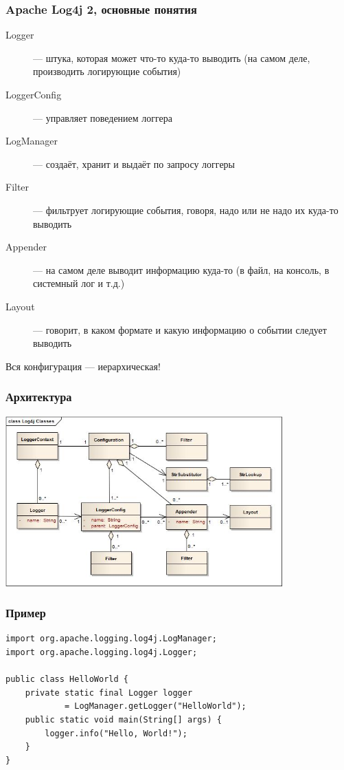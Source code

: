 \documentclass[xetex,mathserif,serif]{beamer}
\begin{document}
	\begin{frame}
		\frametitle{Apache Log4j 2, основные понятия}
		\begin{description}
			\item [Logger] --- штука, которая может что-то куда-то выводить (на самом деле, производить логирующие события)
			\item [LoggerConfig] --- управляет поведением логгера
			\item [LogManager] --- создаёт, хранит и выдаёт по запросу логгеры
			\item [Filter] --- фильтрует логирующие события, говоря, надо или не надо их куда-то выводить
			\item [Appender] --- на самом деле выводит информацию куда-то (в файл, на консоль, в системный лог и т.д.)
			\item [Layout] --- говорит, в каком формате и какую информацию о событии следует выводить
		\end{description}
		\begin{center}Вся конфигурация --- иерархическая!\end{center}
	\end{frame}

	\begin{frame}
		\frametitle{Архитектура}
		\begin{center}
			\includegraphics[width=0.8\textwidth]{log4jClasses.jpg}
		\end{center}
	\end{frame}

	\begin{frame}[fragile]
		\frametitle{Пример}
		\begin{verbatim}
import org.apache.logging.log4j.LogManager;
import org.apache.logging.log4j.Logger;
 
public class HelloWorld {
    private static final Logger logger 
            = LogManager.getLogger("HelloWorld");
    public static void main(String[] args) {
        logger.info("Hello, World!");
    }
}
		\end{verbatim}
\end{frame}
\end{document}
